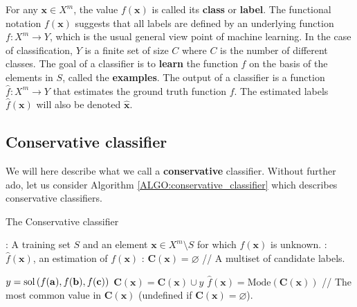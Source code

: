 For any $\mathbf{x} \in X^m$, the value $f(\mathbf{x})$ is called its
\textbf{class} or \textbf{label}.
The functional notation $f(\mathbf{x})$ suggests that all labels
are defined by an underlying function $f \colon X^m \to Y$, which is the usual
general view point of machine learning. In the case of classification, $Y$ is a
finite set of size $C$ where $C$ is the number of different classes. The goal
of a classifier is to \textbf{learn} the function $f$ on the basis of the
elements in $S$, called the \textbf{examples}. The output of a classifier is a
function $\hat{f} \colon X^m \to Y$ that estimates the ground truth function
$f$. The estimated labels $\hat{f}(\mathbf{x})$ will also be denoted
$\hat{\mathbf{x}}$.

\subsection{Conservative classifier}
\label{SEC:conservative_classifier}

We will here describe what we call a \textbf{conservative} classifier. Without
further ado, let us consider Algorithm \ref{ALGO:conservative_classifier} which
describes conservative classifiers.

\begin{algorithm}[!ht]
\caption{The Conservative classifier}
\label{ALGO:conservative_classifier}
  \begin{algorithmic}
    : A training set $S$ and an element $\mathbf{x} \in X^m
    \setminus S$ for which $f(\mathbf{x})$ is unknown.
    : $\hat{f}(\mathbf{x})$, an estimation of
    $f(\mathbf{x})$
    : $\mathbf{C}(\mathbf{x}) = \varnothing$ \quad \quad // A multiset of candidate
    labels.

    \STATE $y = \text{sol}\left(f(\mathbf{a}), f(\mathbf{b}), f(\mathbf{c})\right)$
    \STATE $ \mathbf{C}(\mathbf{x}) = \mathbf{C}(\mathbf{x}) \cup y$
    \ENDIF
	  \ENDFOR
    \STATE $\hat{f}(\mathbf{x}) = \text{Mode} (\mathbf{C}(\mathbf{x}))$ // The most common value in
    $\mathbf{C}(\mathbf{x})$ (undefined if $\mathbf{C}(\mathbf{x}) = \varnothing$).
  \end{algorithmic}
\end{algorithm}

